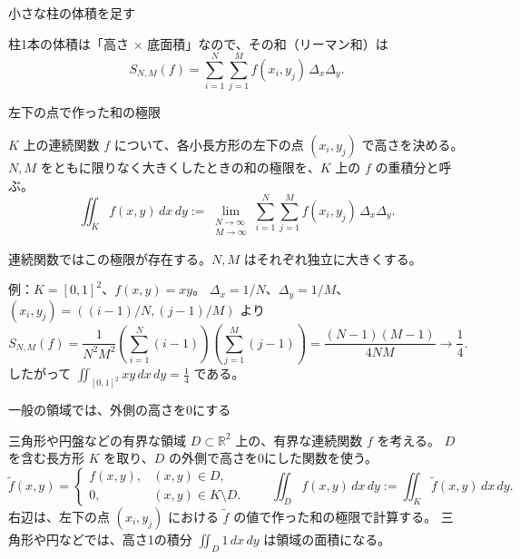 \documentclass[a4paper,10pt,pdflatex,ja=standard,jafont=ipaex-type1,
  magstyle=real,scale=1]{bxjsarticle}
\newcommand{\topic}[1]{\par\vspace{5pt}%
  {\large\sffamily\mdseries\color{accent}#1}\par\vspace{2pt}}
\newcommand{\keybox}[1]{\par\vspace{3pt}\begingroup
  \setlength{\fboxsep}{4pt}%
  \colorbox{soft}{\parbox{\dimexpr\linewidth-2\fboxsep\relax}{\small #1}}%
  \endgroup\par\vspace{2pt}}
\newcommand{\examplelabel}[1]{{\sffamily\mdseries\color{ink}#1}}
\begin{document}
\topic{小さな柱の体積を足す}
柱1本の体積は「高さ $\times$ 底面積」なので、その和（リーマン和）は
$$
 S_{N,M}(f)=\sum_{i=1}^N\sum_{j=1}^M f(x_i,y_j)\,\Delta_x\Delta_y.
$$

\newpage
\noindent\begin{minipage}[b][\dimexpr0.5\textheight-\parskip\relax][t]{\linewidth}
\topic{左下の点で作った和の極限}
\keybox{$K$ 上の連続関数 $f$ について、各小長方形の左下の点 $(x_i,y_j)$ で高さを決める。
$N,M$ をともに限りなく大きくしたときの和の極限を、$K$ 上の $f$ の重積分と呼ぶ。
$$
 \iint_K f(x,y)\,dx\,dy
 :=\lim_{\substack{N\to\infty\\M\to\infty}}
 \sum_{i=1}^N\sum_{j=1}^M f(x_i,y_j)\,\Delta_x\Delta_y.
$$
}
連続関数ではこの極限が存在する。$N,M$ はそれぞれ独立に大きくする。

\examplelabel{例：$K=[0,1]^2$、$f(x,y)=xy$。}
$\Delta_x=1/N$、$\Delta_y=1/M$、$(x_i,y_j)=((i-1)/N,(j-1)/M)$ より
$$
 S_{N,M}(f)=\frac1{N^2M^2}
 \left(\sum_{i=1}^N(i-1)\right)\left(\sum_{j=1}^M(j-1)\right)
 =\frac{(N-1)(M-1)}{4NM}\longrightarrow\frac14.
$$
したがって $\displaystyle\iint_{[0,1]^2}xy\,dx\,dy=\frac14$ である。

\topic{一般の領域では、外側の高さを0にする}
三角形や円盤などの有界な領域 $D\subset\mathbb R^2$ 上の、有界な連続関数 $f$ を考える。
$D$ を含む長方形 $K$ を取り、$D$ の外側で高さを0にした関数を使う。
$$
 \widetilde f(x,y)=\begin{cases}
  f(x,y),&(x,y)\in D,\\
  0,&(x,y)\in K\setminus D.
 \end{cases}
 \qquad
 \iint_D f(x,y)\,dx\,dy:=\iint_K\widetilde f(x,y)\,dx\,dy.
$$
右辺は、左下の点 $(x_i,y_j)$ における $\widetilde f$ の値で作った和の極限で計算する。
三角形や円などでは、高さ1の積分 $\displaystyle\iint_D1\,dx\,dy$ は領域の面積になる。

\end{minipage}\par\nointerlineskip
\end{document}

